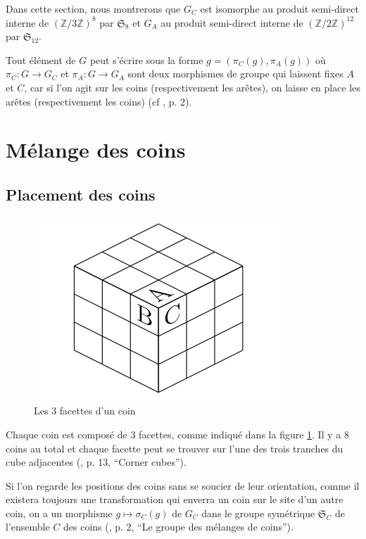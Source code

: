 \documentclass[french]{report}
\begin{document}
Dans cette section, nous montrerons que $G_C $ est isomorphe au produit semi-direct interne de $(\mathbb{Z}/{ 3 }\mathbb{Z}) ^{8}$ par $\mathfrak{S}_{8} $ et $G_A$ au produit semi-direct interne de $(\mathbb{Z}/{ 2 }\mathbb{Z}) ^{12}$ par $\mathfrak{S}_{12}  $.

Tout élément de $G$ peut s'écrire sous la forme $g  = (\pi_C(g), \pi_A(g))$ où $\pi_C : G \to G_C$ et $\pi_A : G \to G_A$ sont deux morphismes de groupe qui laissent fixes $A$ et $C$, car si l'on agit sur les coins (respectivement les arêtes), on laisse en place les arêtes (respectivement les coins) (cf \cite{colmez_rubik}, p. 2).

\section{Mélange des coins}

\subsection{Placement des coins}

\begin{figure}[h!] \label{cube_coin}
  \centering
  \includegraphics[scale=0.3]{figures/cube_coin.png}
  \caption{Les 3 facettes d'un coin}
  \label{cube_coin}
\end{figure}

Chaque coin est composé de 3 facettes, comme indiqué dans la figure \ref{cube_coin}. Il y a 8 coins au total et chaque facette peut se trouver sur l'une des trois tranches du cube adjacentes (\cite{daniels}, p. 13, ``Corner cubes'').

Si l'on regarde les positions des coins sans se soucier de leur orientation, comme il existera toujours une transformation qui enverra un coin sur le site d'un autre coin, on a un morphisme $g \mapsto \sigma_C(g)$ de $G_C$ dans le groupe symétrique $\mathfrak{S}_{C}$ de l'ensemble $C$ des coins (\cite{colmez_rubik}, p. 2, ``Le groupe des mélanges de coins'').
\end{document}
